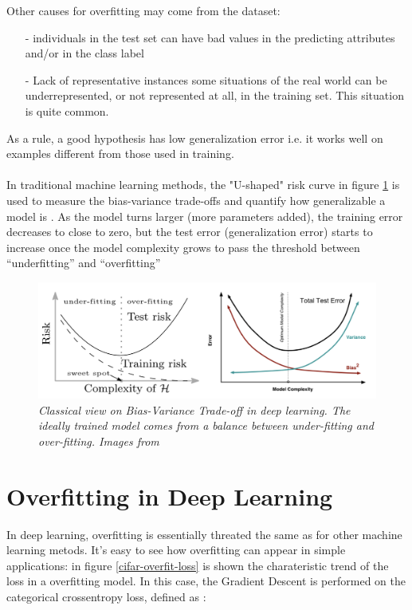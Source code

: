 \documentclass[11pt,a4paper]{article}
\begin{document}
Other causes for overfitting may come from the dataset: 

\begin{itemize}
 \item [-] individuals in the test set can have bad values in the predicting attributes
           and/or in the class label
 \item [-] Lack of representative instances some situations of the real world can be underrepresented, or not represented at all, in the training set. This situation is quite common.
\end{itemize}

As a rule, a good hypothesis has low generalization error i.e. it works well on examples different from those used in training.
\\
\\
In traditional machine learning methods, the "U-shaped" risk curve in figure \ref{bias-variance-tradeoff} is used to measure the bias-variance trade-offs and quantify how generalizable a model is \cite{weng2019overfit}.
As the model turns larger (more parameters added), the training error decreases to close to zero, but the test error (generalization error) starts to increase once the model complexity grows to pass the threshold between “underfitting” and “overfitting”

\begin{figure}[H]
 \centering
 \includegraphics[scale=0.3]{../images/bias-variance-risk-curve.png}
 \caption{\textit{Classical view on Bias-Variance Trade-off in deep learning. The ideally trained model comes from a balance between under-fitting and over-fitting. Images from \cite{doubleU}}}  
 \label{bias-variance-tradeoff}
\end{figure}

\section*{Overfitting in Deep Learning}

In deep learning, overfitting is essentially threated the same as for other machine learning metods. 
It's easy to see how overfitting can appear in simple applications: in figure \ref{cifar-overfit-loss} is shown the charateristic trend of the loss in a overfitting model. 
In this case, the Gradient Descent is performed on the categorical crossentropy loss, defined as : 
\end{document}
